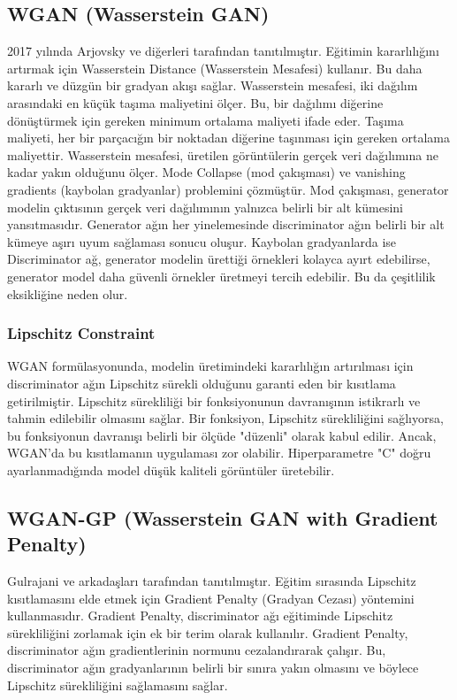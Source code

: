 \subsection{WGAN (Wasserstein GAN)}
2017 yılında Arjovsky ve diğerleri tarafından tanıtılmıştır. Eğitimin kararlılığını artırmak için Wasserstein Distance (Wasserstein Mesafesi) kullanır. Bu daha kararlı ve düzgün bir gradyan akışı sağlar.  Wasserstein mesafesi, iki dağılım arasındaki en küçük taşıma maliyetini ölçer. Bu, bir dağılımı diğerine dönüştürmek için gereken minimum ortalama maliyeti ifade eder. Taşıma maliyeti, her bir parçacığın bir noktadan diğerine taşınması için gereken ortalama maliyettir. Wasserstein mesafesi, üretilen görüntülerin gerçek veri dağılımına ne kadar yakın olduğunu ölçer. Mode Collapse (mod çakışması) ve vanishing gradients (kaybolan gradyanlar) problemini çözmüştür. Mod çakışması, generator modelin çıktısının gerçek veri dağılımının yalnızca belirli bir alt kümesini yansıtmasıdır. Generator ağın her yinelemesinde discriminator ağın belirli bir alt kümeye aşırı uyum sağlaması sonucu oluşur. Kaybolan gradyanlarda ise Discriminator ağ, generator modelin ürettiği örnekleri kolayca ayırt edebilirse, generator model daha güvenli örnekler üretmeyi tercih edebilir. Bu da çeşitlilik eksikliğine neden olur.

\subsubsection{Lipschitz Constraint}
WGAN formülasyonunda, modelin üretimindeki kararlılığın artırılması için discriminator ağın Lipschitz sürekli olduğunu garanti eden bir kısıtlama getirilmiştir. Lipschitz sürekliliği bir fonksiyonunun davranışının istikrarlı ve tahmin edilebilir olmasını sağlar. Bir fonksiyon, Lipschitz sürekliliğini sağlıyorsa, bu fonksiyonun davranışı belirli bir ölçüde "düzenli" olarak kabul edilir. Ancak, WGAN'da bu kısıtlamanın uygulaması zor olabilir. Hiperparametre "C" doğru ayarlanmadığında model düşük kaliteli görüntüler üretebilir.

\subsection{WGAN-GP (Wasserstein GAN with Gradient Penalty)}
Gulrajani ve arkadaşları tarafından tanıtılmıştır. Eğitim sırasında Lipschitz kısıtlamasını elde etmek için Gradient Penalty (Gradyan Cezası) yöntemini kullanmasıdır. Gradient Penalty, discriminator ağı eğitiminde Lipschitz sürekliliğini zorlamak için ek bir terim olarak kullanılır. Gradient Penalty, discriminator ağın gradientlerinin normunu cezalandırarak çalışır. Bu, discriminator ağın gradyanlarının belirli bir sınıra yakın olmasını ve böylece Lipschitz sürekliliğini sağlamasını sağlar.

